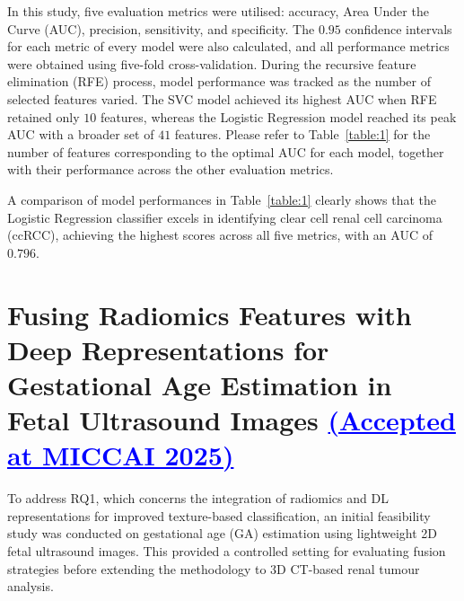 In this study, five evaluation metrics were utilised: accuracy, Area Under the Curve (AUC), precision, sensitivity, and specificity. The $0.95$ confidence intervals for each metric of every model were also calculated, and all performance metrics were obtained using five-fold cross-validation. During the recursive feature elimination (RFE) process, model performance was tracked as the number of selected features varied. The SVC model achieved its highest AUC when RFE retained only $10$ features, whereas the Logistic Regression model reached its peak AUC with a broader set of $41$ features. Please refer to Table~\ref{table:1} for the number of features corresponding to the optimal AUC for each model, together with their performance across the other evaluation metrics.

A comparison of model performances in Table~\ref{table:1} clearly shows that the Logistic Regression classifier excels in identifying clear cell renal cell carcinoma (ccRCC), achieving the highest scores across all five metrics, with an AUC of $0.796$. 






\section{Fusing Radiomics Features with Deep Representations for Gestational Age Estimation in Fetal Ultrasound Images \textcolor{blue}{\uline{(Accepted at MICCAI 2025)}}}\label{Sec:fang}

To address RQ1, which concerns the integration of radiomics and DL representations for improved texture-based classification, an initial feasibility study was conducted on gestational age (GA) estimation using lightweight 2D fetal ultrasound images. This provided a controlled setting for evaluating fusion strategies before extending the methodology to 3D CT-based renal tumour analysis.

